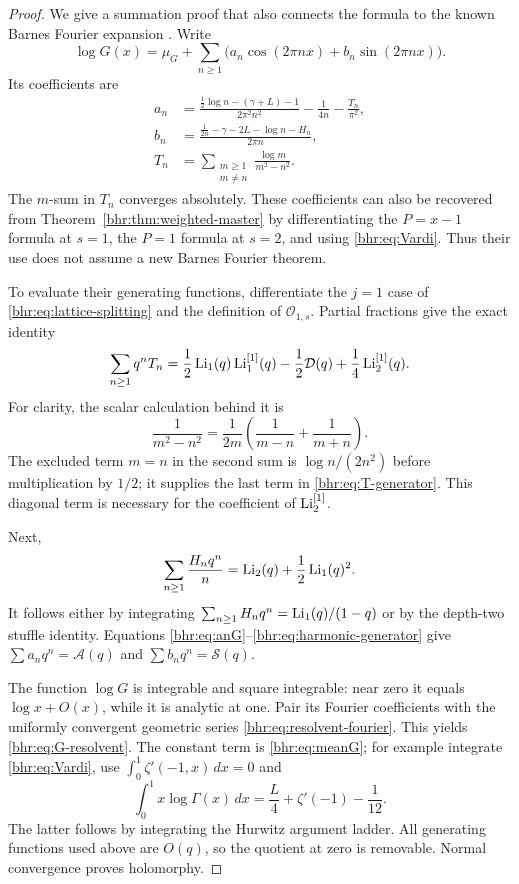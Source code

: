 \begin{proof}
We give a summation proof that also connects the formula to the
known Barnes Fourier expansion \cite[Theorems 2--3]{bhr:Mezo}.
Write
\[
 \log G(x)=\mu_G+\sum_{n\ge1}
                  \bigl(a_n\cos(2\pi nx)+b_n\sin(2\pi nx)\bigr).
\]
Its coefficients are
\begin{align}
 a_n&=\frac{\frac12\log n-(\gamma+L)-1}{2\pi^2n^2}
                -\frac1{4n}-\frac{T_n}{\pi^2},\label{bhr:eq:anG}\\
 b_n&=\frac{\frac1{2n}-\gamma-2L-\log n-H_n}{2\pi n},
          \label{bhr:eq:bnG}\\
 T_n&=\sum_{\substack{m\ge1\\m\ne n}}
                          \frac{\log m}{m^2-n^2}.
          \label{bhr:eq:Tn}
\end{align}
The $m$-sum in $T_n$ converges absolutely. These coefficients
can also be recovered from Theorem~\ref{bhr:thm:weighted-master}
by differentiating the $P=x-1$ formula at $s=1$, the $P=1$
formula at $s=2$, and using \eqref{bhr:eq:Vardi}. Thus their use
does not assume a new Barnes Fourier theorem.

To evaluate their generating functions, differentiate the
$j=1$ case of \eqref{bhr:eq:lattice-splitting} and the definition
of $\mathcal O_{1,s}$. Partial fractions give the exact identity
\begin{equation}\label{bhr:eq:T-generator}
 \sum_{n\ge1}q^nT_n
   =\frac12\operatorname{Li}_1(q)\operatorname{Li}_1^{[1]}(q)
       -\frac12\mathcal D(q)+\frac14\operatorname{Li}_2^{[1]}(q).
\end{equation}
For clarity, the scalar calculation behind it is
\[
 \frac1{m^2-n^2}=
     \frac1{2m}\left(\frac1{m-n}+\frac1{m+n}\right).
\]
The excluded term $m=n$ in the second sum is
$\log n/(2n^2)$ before multiplication by $1/2$; it supplies
the last term in \eqref{bhr:eq:T-generator}. This diagonal term
is necessary for the coefficient of $\operatorname{Li}_2^{[1]}$.

Next,
\begin{equation}\label{bhr:eq:harmonic-generator}
 \sum_{n\ge1}\frac{H_nq^n}{n}
      =\operatorname{Li}_2(q)+\frac12\operatorname{Li}_1(q)^2.
\end{equation}
It follows either by integrating
$\sum_{n\ge1}H_nq^n=\operatorname{Li}_1(q)/(1-q)$ or by the depth-two
stuffle identity. Equations \eqref{bhr:eq:anG}--\eqref{bhr:eq:harmonic-generator}
give $\sum a_nq^n=\mathcal A(q)$ and
$\sum b_nq^n=\mathcal S(q)$.

The function $\log G$ is integrable and square integrable:
near zero it equals $\log x+O(x)$, while it is analytic at one.
Pair its Fourier coefficients with the uniformly convergent
geometric series \eqref{bhr:eq:resolvent-fourier}. This yields
\eqref{bhr:eq:G-resolvent}. The constant term is
\eqref{bhr:eq:meanG}; for example integrate \eqref{bhr:eq:Vardi}, use
$\int_0^1\zeta'(-1,x)\,dx=0$ and
\[
 \int_0^1x\log\Gamma(x)\,dx
       =\frac L4+\zeta'(-1)-\frac1{12}.
\]
The latter follows by integrating the Hurwitz argument ladder.
All generating functions used above are $O(q)$, so the quotient
at zero is removable. Normal convergence proves holomorphy.
\end{proof}

